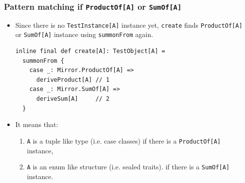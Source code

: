 \begin{frame}[fragile]
\end{frame}

\begin{frame}[fragile]
  \frametitle{ Pattern matching if \lstinline|ProductOf[A]| or \lstinline|SumOf[A]|}

  \begin{itemize}
    \item Since there is no \lstinline|TestInstance[A]| instance yet,
    \lstinline|create| finds \lstinline|ProductOf[A]| or \lstinline|SumOf[A]|
    instance using \lstinline|summonFrom| again.
\begin{lstlisting}[style=scala]
inline final def create[A]: TestObject[A] =
  summonFrom {
    case _: Mirror.ProductOf[A] =>
      deriveProduct[A] // 1
    case _: Mirror.SumOf[A] =>
      deriveSum[A]     // 2
  }
\end{lstlisting}

    \item It means that:
    \begin{enumerate}
      \item \lstinline|A| is a tuple like type (i.e. case classes)
      if there is a \lstinline|ProductOf[A]| instance,
      \item \lstinline|A| is an enum like structure (i.e. sealed traits).
      if there is a \lstinline|SumOf[A]| instance.
    \end{enumerate}
  \end{itemize}

\end{frame}

